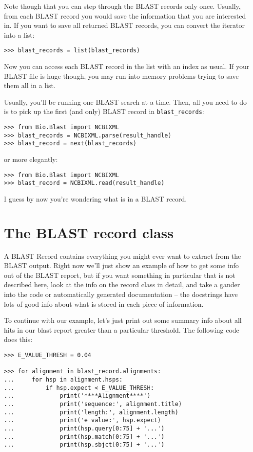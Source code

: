 \documentclass{report}
\begin{document}
Note though that you can step through the BLAST records only once.
Usually, from each BLAST record you would save the information that
you are interested in. If you want to save all returned BLAST records,
you can convert the iterator into a list:
\begin{verbatim}
>>> blast_records = list(blast_records)
\end{verbatim}
Now you can access each BLAST record in the list with an index as usual.
If your BLAST file is huge though, you may run into memory problems trying to
save them all in a list.

Usually, you'll be running one BLAST search at a time. Then, all you need
to do is to pick up the first (and only) BLAST record in \verb|blast_records|:
\begin{verbatim}
>>> from Bio.Blast import NCBIXML
>>> blast_records = NCBIXML.parse(result_handle)
>>> blast_record = next(blast_records)
\end{verbatim}
\noindent or more elegantly:
\begin{verbatim}
>>> from Bio.Blast import NCBIXML
>>> blast_record = NCBIXML.read(result_handle)
\end{verbatim}

I guess by now you're wondering what is in a BLAST record.

\section{The BLAST record class}

A BLAST Record contains everything you might ever want to extract from the
BLAST output. Right now we'll just show
an example of how to get some info out of the BLAST report, but if you
want something in particular that is not described here, look at the
info on the record class in detail, and take a gander into the code or
automatically generated documentation -- the docstrings have lots of
good info about what is stored in each piece of information.

To continue with our example, let's just print out some summary info
about all hits in our blast report greater than a particular
threshold. The following code does this:

\begin{verbatim}
>>> E_VALUE_THRESH = 0.04

>>> for alignment in blast_record.alignments:
...     for hsp in alignment.hsps:
...         if hsp.expect < E_VALUE_THRESH:
...             print('****Alignment****')
...             print('sequence:', alignment.title)
...             print('length:', alignment.length)
...             print('e value:', hsp.expect)
...             print(hsp.query[0:75] + '...')
...             print(hsp.match[0:75] + '...')
...             print(hsp.sbjct[0:75] + '...')
\end{verbatim}
\end{document}

